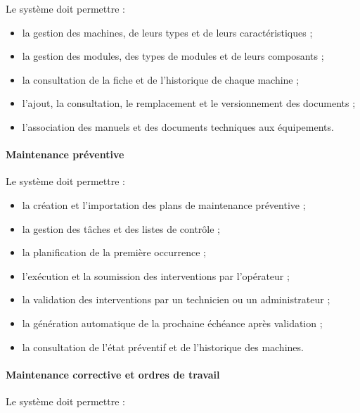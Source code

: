 Le système doit permettre :

\begin{itemize}
    \item la gestion des machines, de leurs types et de leurs caractéristiques ;
    \item la gestion des modules, des types de modules et de leurs composants ;
    \item la consultation de la fiche et de l’historique de chaque machine ;
    \item l’ajout, la consultation, le remplacement et le versionnement des documents ;
    \item l’association des manuels et des documents techniques aux équipements.
\end{itemize}

\paragraph{Maintenance préventive}

Le système doit permettre :

\begin{itemize}
    \item la création et l’importation des plans de maintenance préventive ;
    \item la gestion des tâches et des listes de contrôle ;
    \item la planification de la première occurrence ;
    \item l’exécution et la soumission des interventions par l’opérateur ;
    \item la validation des interventions par un technicien ou un administrateur ;
    \item la génération automatique de la prochaine échéance après validation ;
    \item la consultation de l’état préventif et de l’historique des machines.
\end{itemize}

\paragraph{Maintenance corrective et ordres de travail}

Le système doit permettre :

